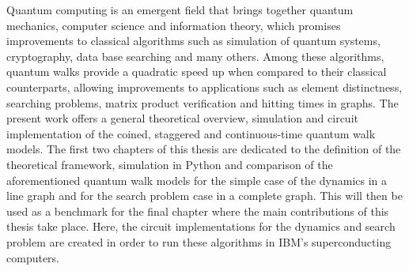 \documentclass[../../dissertation.tex]{subfiles}
\begin{document}
Quantum computing is an emergent field that brings together quantum mechanics,
computer science and information theory, which promises improvements to
classical algorithms such as simulation of quantum systems, cryptography, data
base searching and many others.  Among these algorithms, quantum walks provide
a quadratic speed up when compared to their classical  counterparts,  allowing
improvements to applications such as element distinctness, searching problems,
matrix product verification and hitting times in graphs.  The present work
offers a general theoretical overview, simulation and circuit implementation of
the coined, staggered and continuous-time quantum walk models. The first two
chapters of this thesis are dedicated to the definition of the theoretical
framework, simulation in Python and comparison of the aforementioned quantum
walk models for the simple case of the dynamics in a line graph and for the
search problem case in a complete graph. This will then be used as a benchmark
for the final chapter where the main contributions of this thesis take place.
Here, the circuit implementations for the dynamics and search problem are
created in order to run these algorithms in IBM's superconducting computers.
\end{document}
